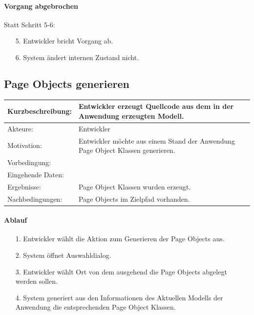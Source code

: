 \paragraph{Vorgang abgebrochen}
Statt Schritt 5-6:
\begin{itemize}[itemsep=0pt]
\item[5.] Entwickler bricht Vorgang ab. 
\item[6.] System ändert internen Zustand nicht. 
\end{itemize}

\subsection{Page Objects generieren}
\label{sec:generate_page_objects}

\begin{tabular}[h]{|p{4cm}|p{}|}
\hline 
\rule[-1ex]{0pt}{2.5ex}Kurzbeschreibung: & 
Entwickler erzeugt Quellcode aus dem in der Anwendung erzeugten Modell. \\  
\hline 
\rule[-1ex]{0pt}{2.5ex}Akteure: & 
Entwickler \\ 
\hline 
\rule[-1ex]{0pt}{2.5ex}Motivation: & 
Entwickler möchte aus einem Stand der Anwendung Page Object Klassen generieren. \\ 
\hline 
\rule[-1ex]{0pt}{2.5ex}Vorbedingung: &  \\ 
\hline 
\rule[-1ex]{0pt}{2.5ex}Eingehende Daten: & \\ 
\hline 
\rule[-1ex]{0pt}{2.5ex}Ergebnisse: & Page Object Klassen wurden erzeugt. \\ 
\hline 
\rule[-1ex]{0pt}{2.5ex}Nachbedingungen: & Page Objects im Zielpfad vorhanden.  \\ 
\hline 
\end{tabular} 

\paragraph{Ablauf}

\begin{itemize}[itemsep=0pt]
\item[1.] Entwickler wählt die Aktion zum Generieren der Page Objects aus.
\item[2.] System öffnet Auswahldialog. 
\item[3.] Entwickler wählt Ort von dem ausgehend die Page Objects abgelegt werden sollen.
\item[4.] System generiert aus den Informationen des Aktuellen Modells der Anwendung die entsprechenden Page Object Klassen.

\end{itemize}

